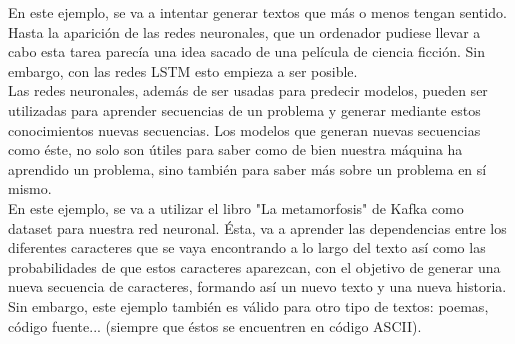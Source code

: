 \label{ej_lstm}
En este ejemplo, se va a intentar generar textos que más o menos tengan sentido. Hasta la aparición de las redes neuronales, que un ordenador pudiese llevar a cabo esta tarea parecía una idea sacado de una película de ciencia ficción. Sin embargo, con las redes LSTM esto empieza a ser posible.\\
Las redes neuronales, además de ser usadas para predecir modelos, pueden ser utilizadas para aprender secuencias de un problema y generar mediante estos conocimientos nuevas secuencias. Los modelos que generan nuevas secuencias como éste, no solo son útiles para saber como de bien nuestra máquina ha aprendido un problema, sino también para saber más sobre un problema en sí mismo.\\
En este ejemplo, se va a utilizar el libro "La metamorfosis" de Kafka como dataset para nuestra red neuronal. Ésta, va a aprender las dependencias entre los diferentes caracteres que se vaya encontrando a lo largo del texto así como las probabilidades de que estos caracteres aparezcan, con el objetivo de generar una nueva secuencia de caracteres, formando así un nuevo texto y una nueva historia. Sin embargo, este ejemplo también es válido para otro tipo de textos: poemas, código fuente... (siempre que éstos se encuentren en código ASCII).
